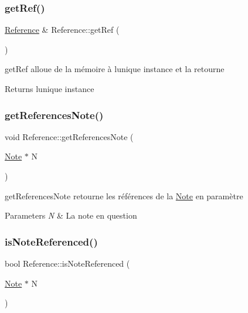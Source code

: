 \subsubsection{\texorpdfstring{get\+Ref()}{getRef()}}
{\footnotesize\ttfamily \hyperlink{classReference}{Reference} \& Reference\+::get\+Ref (\begin{DoxyParamCaption}{ }\end{DoxyParamCaption})\hspace{0.3cm}{\ttfamily [static]}}



get\+Ref alloue de la mémoire à l\textquotesingle{}unique instance et la retourne 

\begin{DoxyReturn}{Returns}
l\textquotesingle{}unique instance 
\end{DoxyReturn}
\mbox{\label{classReference_ab804f3401b2e29c1b4e6c92896d66d0a}} 
\subsubsection{\texorpdfstring{get\+References\+Note()}{getReferencesNote()}}
{\footnotesize\ttfamily void Reference\+::get\+References\+Note (\begin{DoxyParamCaption}\item[{\hyperlink{classNote}{Note} $\ast$}]{N }\end{DoxyParamCaption})}



get\+References\+Note retourne les références de la \hyperlink{classNote}{Note} en paramètre 


\begin{DoxyParams}{Parameters}
{\em N} & La note en question \\
\hline
\end{DoxyParams}
\mbox{\label{classReference_a591e94c8fc4526305181b563867b85d1}} 
\subsubsection{\texorpdfstring{is\+Note\+Referenced()}{isNoteReferenced()}}
{\footnotesize\ttfamily bool Reference\+::is\+Note\+Referenced (\begin{DoxyParamCaption}\item[{\hyperlink{classNote}{Note} $\ast$}]{N }\end{DoxyParamCaption})\hspace{0.3cm}{\ttfamily [static]}}



